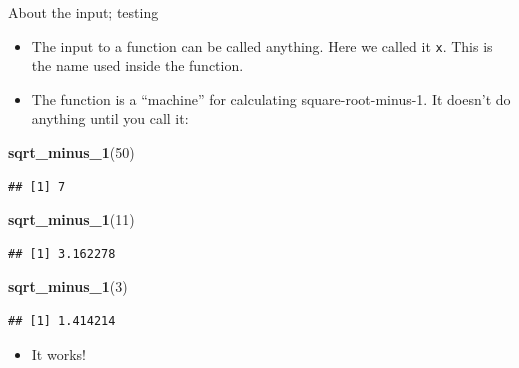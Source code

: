 \documentclass[ignorenonframetext,]{beamer}
\newenvironment{Shaded}{\begin{snugshade}}{\end{snugshade}}
\newcommand{\DecValTok}[1]{\textcolor[rgb]{0.00,0.00,0.81}{#1}}
\newcommand{\KeywordTok}[1]{\textcolor[rgb]{0.13,0.29,0.53}{\textbf{#1}}}
\newcommand{\NormalTok}[1]{#1}
\providecommand{\tightlist}{%
  \setlength{\itemsep}{0pt}\setlength{\parskip}{0pt}}
\begin{document}
\begin{frame}[fragile]{About the input; testing}
\protect\hypertarget{about-the-input-testing}{}

\begin{itemize}
\tightlist
\item
  The input to a function can be called anything. Here we called it
  \texttt{x}. This is the name used inside the function.
\item
  The function is a ``machine'' for calculating square-root-minus-1. It
  doesn't do anything until you call it:
\end{itemize}

\begin{Shaded}
\begin{Highlighting}[]
\KeywordTok{sqrt_minus_1}\NormalTok{(}\DecValTok{50}\NormalTok{)}
\end{Highlighting}
\end{Shaded}

\begin{verbatim}
## [1] 7
\end{verbatim}

\begin{Shaded}
\begin{Highlighting}[]
\KeywordTok{sqrt_minus_1}\NormalTok{(}\DecValTok{11}\NormalTok{)}
\end{Highlighting}
\end{Shaded}

\begin{verbatim}
## [1] 3.162278
\end{verbatim}

\begin{Shaded}
\begin{Highlighting}[]
\KeywordTok{sqrt_minus_1}\NormalTok{(}\DecValTok{3}\NormalTok{)}
\end{Highlighting}
\end{Shaded}

\begin{verbatim}
## [1] 1.414214
\end{verbatim}

\begin{itemize}
\tightlist
\item
  It works!
\end{itemize}

\end{frame}
\end{document}
